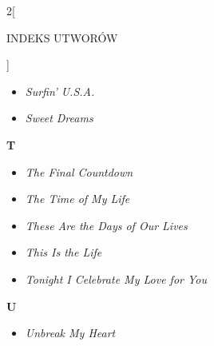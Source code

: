 \documentclass[a4paper]{report}
\begin{document}
\begin{multicols*}{2}[\begin{Huge}INDEKS UTWORÓW\end{Huge}\vspace{1cm}]
\begin{minipage}{\columnwidth}
\begin{itemize}[topsep=6pt, after=\vspace{5mm}, leftmargin=0mm]
		\itemsep0em
		\item[]  \textit{Surfin' U.S.A.}  \\
		\item[]  \textit{Sweet Dreams}  \\
	\end{itemize}
\end{minipage}
\begin{minipage}{\columnwidth}
\begin{Large}
		\textbf{T}
	\end{Large} 
	\begin{itemize}[topsep=6pt, after=\vspace{1.5mm}, leftmargin=0mm]
		\itemsep0em
		\item[]\textit{The Final Countdown}  \\
		\item[]  \textit{The Time of My Life}  \\
	\end{itemize}
\end{minipage}
\begin{minipage}{\columnwidth}
	\begin{itemize}[topsep=6pt, after=\vspace{1.5mm}, leftmargin=0mm]
		\itemsep0em
		\item[]  \textit{These Are the Days of Our Lives}  \\
	\end{itemize}
\end{minipage}
\begin{minipage}{\columnwidth}
	\begin{itemize}[topsep=6pt, after=\vspace{5mm}, leftmargin=0mm]
		\itemsep0em
		\item[]  \textit{This Is the Life}  \\
		\item[]  \textit{Tonight I Celebrate My Love for You}  \\
	\end{itemize}
\end{minipage}
\begin{minipage}{\columnwidth}
\begin{Large}
		\textbf{U}
	\end{Large} 
	\begin{itemize}[topsep=6pt, after=\vspace{5mm}, leftmargin=0mm]
		\itemsep0em
		\item[]\textit{Unbreak My Heart}  \\

\end{itemize}
\end{minipage}
\end{multicols*}
\end{document}
